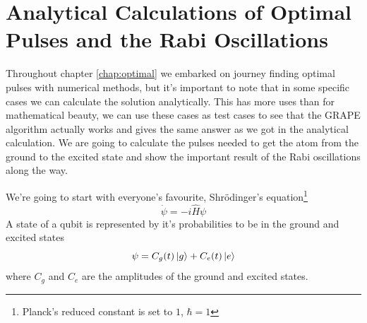 \documentclass[english, a4paper, 12pt, twoside]{article}
\numberwithin{equation}{section} %
\begin{document}


\newpage
\section{Analytical Calculations of Optimal Pulses and the Rabi Oscillations} \label{appen:annalytic}
Throughout chapter \ref{chap:optimal} we embarked on journey finding optimal pulses with numerical methods, but it's important to note that in some specific cases we can calculate the solution analytically. This has more uses than for mathematical beauty, we can use these cases as test cases to see that the GRAPE algorithm actually works and gives the same answer as we got in the analytical calculation. We are going to calculate the pulses needed to get the atom from the ground to the excited state and show the important result of the Rabi oscillations along the way.

We're going to start with everyone's favourite, Shr\"{o}dinger's equation\footnote{Planck's reduced constant is set to $1$, $\hbar = 1$}
\[
    \dot{\psi} = -i \hat{H} \psi
\]
A state of a qubit is represented by it's probabilities to be in the ground and excited states
\[
    \psi = C_g(t) \ket{g} + C_e(t) \ket{e}
\]
where $C_g$ and $C_e$ are the amplitudes of the ground and excited states.
\end{document}
